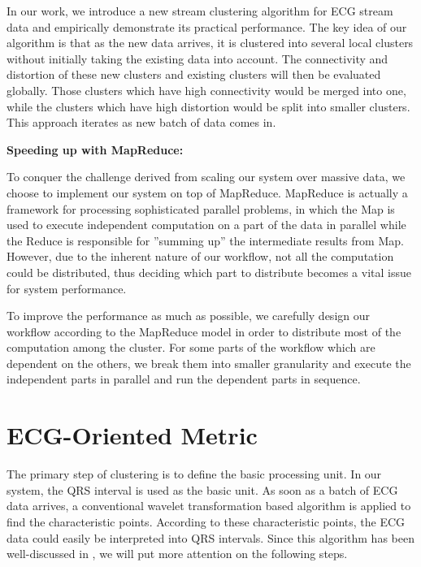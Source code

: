 \documentclass[conference]{IEEEtran}
\begin{document}
In our work, we introduce a new stream clustering algorithm for ECG stream data and empirically demonstrate its practical performance. The key idea of our algorithm is that as the new data arrives, it is clustered into several local clusters without initially taking the existing data into account. The connectivity and distortion of these new clusters and existing clusters will then be evaluated globally. Those clusters which have high connectivity would be merged into one, while the clusters which have high distortion would be split into smaller clusters. This approach iterates as new batch of data comes in.


\textbf{Speeding up with MapReduce:}


To conquer the challenge derived from scaling our system over massive data, we choose to implement our system on top of MapReduce. MapReduce is actually a framework for processing sophisticated parallel problems, in which the Map is used to execute independent computation on a part of the data in parallel while the Reduce is responsible for ''summing up'' the intermediate results from Map. However, due to the inherent nature of our workflow, not all the computation could be distributed, thus deciding which part to distribute becomes a vital issue for system performance.


To improve the performance as much as possible, we carefully design our workflow according to the MapReduce model in order to distribute most of the computation among the cluster. For some parts of the workflow which are dependent on the others, we break them into smaller granularity and execute the independent parts in parallel and run the dependent parts in sequence.



\section{ECG-Oriented Metric}
The primary step of clustering is to define the basic processing unit. In our system, the QRS interval is used as the basic unit. As soon as a batch of ECG data arrives, a conventional wavelet transformation based algorithm \cite{li1995detection} is applied to find the characteristic points. According to these characteristic points, the ECG data could easily be interpreted into QRS intervals. Since this algorithm has been well-discussed in \cite{li1995detection}, we will put more attention on the following steps.
\end{document}
